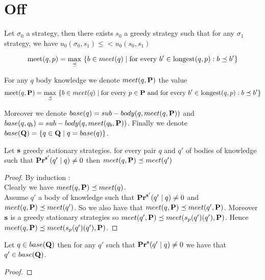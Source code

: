 

\section{Off}

\begin{myprop}
	Let $\sigma_0$ a strategy, then there exists $s_0$ a greedy strategy  such that for any $\sigma_1$ strategy, we have $u_0(\sigma_0,s_1) \leq < u_0(s_0,s_1)$ 
\end{myprop}

$$\text{\rm meet}(q,p)  =  {\displaystyle \max_{\preceq} \ \{b \in meet(q) \mid  \text{for every } b' \in {\text{\rm longest}}(q,p): b \preceq b'\}}$$

For any $q$ body knowledge we denote
$meet(q,\mathbf{P})$ the value $$\text{\rm meet}(q,\mathbf{P})  =  {\displaystyle \max_{\preceq} \ \{b \in meet(q) \mid \text{for every } p\in \mathbf{P} \text{ and for every } b' \in {\text{\rm longest}}(q,p): b \preceq b'\}}$$

Moreover we denote $base(q) = sub-body(q,meet(q,\mathbf{P}))$ and $base(q,q_b) = sub-body(q,meet(q_b,\mathbf{P}))$. Finally we denote $base(\mathbf{Q}) = \{q \in \mathbf{Q} \mid q = base(q)\}$.

\begin{mylem}
	\label{lem-meet}
	Let $\mathbf{s}$ greedy stationary strategies. for every pair $q$ and $q'$ of bodies of knowledge such that $\mathbf{Pr}^{\mathbf{s}'}(q' \mid q) \neq 0$ then $meet(q,\mathbf{P}) \preceq meet(q')$
\end{mylem}	
\begin{proof}
	By induction : 
	\\Clearly we have $meet(q,\mathbf{P}) \preceq meet(q)$.
	\\Assume $q'$ a body of knowledge such that $\mathbf{Pr}^{\mathbf{s}'}(q' \mid q) \neq 0$ and $meet(q,\mathbf{P}) \preceq meet(q')$. So we also have that $meet(q,\mathbf{P}) \preceq meet(q',\mathbf{P})$. Moreover $\mathbf{s}$ is a greedy stationary strategies so $meet(q',\mathbf{P}) \preceq meet(s_p(q')(q'),\mathbf{P})$. Hence $meet(q,\mathbf{P}) \preceq meet(s_p(q')(q'),\mathbf{P})$.
	
\end{proof}


\begin{mylem}
	\label{lem2}
	Let $q \in base(\mathbf{Q})$ then for any $q'$ such that $\mathbf{Pr}^{\mathbf{s}}(q' \mid q) \neq 0$ we have that $q' \in base(\mathbf{Q})$.
\end{mylem}
\begin{proof}
\end{proof}

